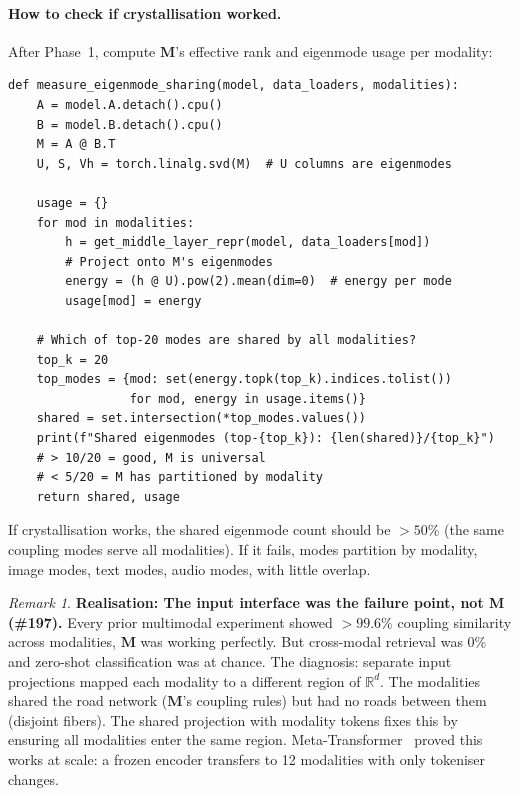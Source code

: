 \documentclass[11pt, a4paper]{article}
\newcommand{\M}{\mathbf{M}}
\newcommand{\R}{\mathbb{R}}
\theoremstyle{remark}
\newtheorem*{remark}{Remark}
\begin{document}
\paragraph{How to check if crystallisation worked.}
After Phase~1, compute $\M$'s effective rank and eigenmode usage per modality:

\begin{lstlisting}[caption={Measuring eigenmode overlap after crystallisation.}]
def measure_eigenmode_sharing(model, data_loaders, modalities):
    A = model.A.detach().cpu()
    B = model.B.detach().cpu()
    M = A @ B.T
    U, S, Vh = torch.linalg.svd(M)  # U columns are eigenmodes

    usage = {}
    for mod in modalities:
        h = get_middle_layer_repr(model, data_loaders[mod])
        # Project onto M's eigenmodes
        energy = (h @ U).pow(2).mean(dim=0)  # energy per mode
        usage[mod] = energy

    # Which of top-20 modes are shared by all modalities?
    top_k = 20
    top_modes = {mod: set(energy.topk(top_k).indices.tolist())
                 for mod, energy in usage.items()}
    shared = set.intersection(*top_modes.values())
    print(f"Shared eigenmodes (top-{top_k}): {len(shared)}/{top_k}")
    # > 10/20 = good, M is universal
    # < 5/20 = M has partitioned by modality
    return shared, usage
\end{lstlisting}

\noindent
If crystallisation works, the shared eigenmode count should be $>50\%$ (the same coupling modes serve all modalities).
If it fails, modes partition by modality, image modes, text modes, audio modes, with little overlap.

\begin{remark}
\textbf{Realisation: The input interface was the failure point, not M (\#197).}
Every prior multimodal experiment showed $>99.6\%$ coupling similarity across modalities, $\M$ was working perfectly.
But cross-modal retrieval was 0\% and zero-shot classification was at chance.
The diagnosis: separate input projections mapped each modality to a different region of $\R^d$.
The modalities shared the road network ($\M$'s coupling rules) but had no roads between them (disjoint fibers).
The shared projection with modality tokens fixes this by ensuring all modalities enter the same region.
Meta-Transformer~\cite{zhang2023metatransformer} proved this works at scale: a frozen encoder transfers to 12 modalities with only tokeniser changes.
\end{remark}
\end{document}
